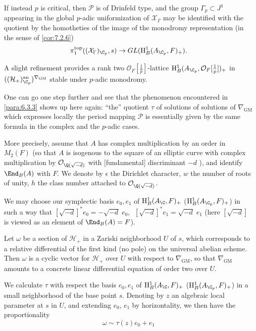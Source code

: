 \begin{para}
 If instead $p$ is critical, then $\mathcal{P}$ is of Drinfeld type, and
 the group $\Gamma_p \subset J^1$ appearing in the global $p$-adic
 uniformization of $\mathcal{X}_{\Gamma}$ may be identified with the
 quotient by the homotheties of the image of the monodromy representation
 (in the sense of \ref{cor:7.2.6})
 \begin{equation*}
  \pi_1^{\mathrm{top}}((\mathcal{X}_{\Gamma })_{\C_p},s)\rightarrow
   GL(\mathrm{H}^1_B(A_{\C_p},F)_+).
 \end{equation*}

 A slight refinement provides a rank two
 $\mathcal{O}_F[\frac{1}{p}]$-lattice
 $\mathrm{H}^1_B(A_{\C_p},\mathcal{O}_F[\frac{1}{p}])_+$ in
 $((\mathcal{H}_+)_{\C_p}^{\mathrm{an}})^{\nabla_{\mathrm{GM}}}$ stable
 under $p$-adic monodromy.
\end{para}

\begin{para}\label{para:7.6.3}
 One can go one step further and see that the phenomenon encountered in
 \ref{para:6.3.3} shows up here again: ``the'' quotient $\tau$ of solutions of
 solutions of ${\nabla_{\mathrm{GM}}}$ which expresses locally the
 period mapping 
 $\mathcal{P}$ is essentially given by the same formula in the complex
 and the $p$-adic cases.


More precisely, assume that $A$ has complex multiplication by an order
in $M_2(F)$ (so that $A$ is isogenous to the square of an elliptic curve
with complex multiplication by $\mathcal{O}_{\Q(\sqrt{-d})}$ with
[fundamental] discriminant $-d$ ), and identify $\End_B(A)$ with $F$. We
denote by $\epsilon$ the Dirichlet character, $w$ the number of roots of
unity, $h$ the class number attached to $\mathcal{O}_{\Q(\sqrt{-d})}$.


\noindent We may choose our symplectic basis $e_0,e_1$ of
$\mathrm{H}^1_B(A_{\C},F)_+$ (\resp $\mathrm{H}^1_B(A_{\C_p},F)_+$) in
 such a way that 
$[\sqrt{-d}]^\ast e_0=-\sqrt{-d} \; e_0,\,$ $[\sqrt{-d}]^\ast
e_1=\sqrt{-d} \;e_1$ (here $[\sqrt{-d}]$ is viewed as an element of
$\End_B(A)=F$).

\noindent Let $\omega$ be a section of $\mathcal{H}_+$ in a Zariski
neighborhood $U$ of $s$, which corresponds to a relative differential of
the first kind (no pole) on the universal abelian scheme. Then $\omega$
is a cyclic vector for $\mathcal{H}_+$ over $U$ with respect to
$\nabla_{\mathrm{GM}}$, so that $\nabla_{\mathrm{GM}}$ amounts to a
 concrete linear 
differential equation of order two over $U$.

\noindent We calculate $\tau$ with respect the basis $e_0, e_1$
 of $\mathrm{H}^1_B(A_{\C},F)_+$ (\resp $\mathrm{H}^1_B(A_{\C_p},F)_+$)
 in a small 
 neighborhood of the base point $s$. Denoting by $z$ an algebraic local
 parameter at $s$ in $U$, and extending $e_0,\, e_1$ by horizontality, we
 then have the proportionality
\begin{equation*}
 \omega \sim \tau(z) e_0 + e_1
\end{equation*}
\end{para}

